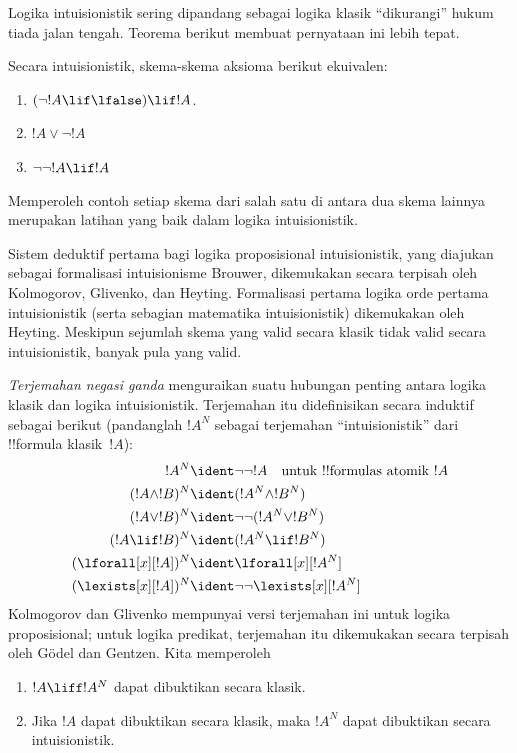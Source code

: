 \documentclass[../../../include/open-logic-section]{subfiles}
\begin{document}
Logika intuisionistik sering dipandang sebagai logika klasik ``dikurangi''
hukum tiada jalan tengah. Teorema berikut membuat pernyataan ini lebih tepat.
\begin{thm}
Secara intuisionistik, skema-skema aksioma berikut ekuivalen:
\begin{enumerate}
\item $(\lnot !A \lif \lfalse) \lif !A$.
\item $!A \lor \lnot !A$
\item $\lnot \lnot !A \lif !A$
\end{enumerate}
\end{thm}
Memperoleh contoh setiap skema dari salah satu di antara dua skema lainnya
merupakan latihan yang baik dalam logika intuisionistik.

Sistem deduktif pertama bagi logika proposisional intuisionistik, yang
diajukan sebagai formalisasi intuisionisme Brouwer, dikemukakan secara
terpisah oleh Kolmogorov, Glivenko, dan Heyting. Formalisasi pertama logika
orde pertama intuisionistik (serta sebagian matematika intuisionistik)
dikemukakan oleh Heyting. Meskipun sejumlah skema yang valid secara klasik
tidak valid secara intuisionistik, banyak pula yang valid.

\emph{Terjemahan negasi ganda} menguraikan suatu hubungan penting antara
logika klasik dan logika intuisionistik. Terjemahan itu didefinisikan secara
induktif sebagai berikut (pandanglah $!A^N$ sebagai terjemahan
``intuisionistik'' dari !!{formula} klasik~$!A$):
\begin{align*}
!A^N & \ident \lnot\lnot !A \quad \text{untuk !!{formula}s atomik $!A$} \\
(!A \land !B)^N & \ident (!A^N \land !B^N) \\
(!A \lor !B)^N & \ident  \lnot\lnot (!A^N \lor !B^N) \\
(!A \lif !B)^N & \ident (!A^N \lif !B^N) \\
(\lforall[x][!A])^N & \ident \lforall[x][!A^N] \\
(\lexists[x][!A])^N & \ident \lnot\lnot\lexists[x][!A^N]
\end{align*}
Kolmogorov dan Glivenko mempunyai versi terjemahan ini untuk logika
proposisional; untuk logika predikat, terjemahan itu dikemukakan secara
terpisah oleh G\"odel dan Gentzen. Kita memperoleh

\begin{thm}
\begin{enumerate}
\item $!A \liff !A^N$ dapat dibuktikan secara klasik.
\item Jika $!A$ dapat dibuktikan secara klasik, maka $!A^N$ dapat dibuktikan
  secara intuisionistik.
\end{enumerate}
\end{thm}
\end{document}
